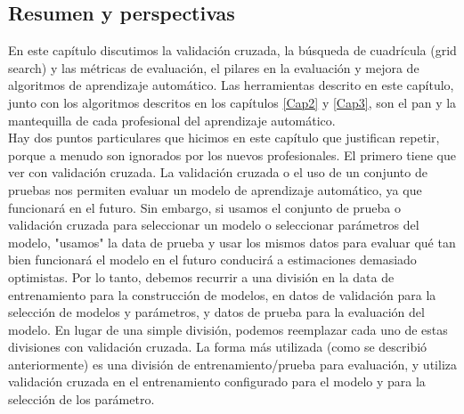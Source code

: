 {\begin{lstlisting}
\end{lstlisting}
 
 
 
 
 
 
 \subsection{Resumen y perspectivas}
 
 En este capítulo discutimos la validación cruzada, la búsqueda de cuadrícula (grid search) y las métricas de evaluación, el  pilares en la evaluación y mejora de algoritmos de aprendizaje automático. Las herramientas  descrito en este capítulo, junto con los algoritmos descritos en los capítulos \ref{Cap2}  y \ref{Cap3},  son el pan y la mantequilla de cada profesional del aprendizaje automático.\\
 
 Hay dos puntos particulares que hicimos en este capítulo que justifican repetir,
 porque a menudo son ignorados por los nuevos profesionales. El primero tiene que ver con
 validación cruzada. La validación cruzada o el uso de un conjunto de pruebas  nos permiten evaluar un
 modelo de aprendizaje automático, ya que funcionará en el futuro.    Sin embargo, si usamos el conjunto de prueba  o validación cruzada para seleccionar un modelo o seleccionar parámetros del modelo, "{}usamos"{} la data de  prueba y usar los mismos datos para evaluar qué tan bien funcionará el modelo en el futuro  conducirá a estimaciones demasiado optimistas.   Por lo tanto, debemos recurrir a una división en la data de entrenamiento para la construcción de modelos, en datos de validación para la selección de modelos y parámetros,  y datos de prueba para la evaluación del modelo.  En lugar de una simple división, podemos reemplazar cada uno de estas divisiones con validación cruzada.  La forma más utilizada (como se describió anteriormente) es una división de entrenamiento{\scriptsize/}prueba para evaluación, y utiliza validación cruzada en el entrenamiento  configurado para el modelo y para la selección de los  parámetro.\\

}
